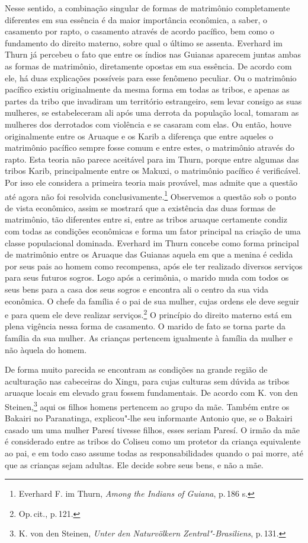 Nesse sentido, a combinação singular de formas de matrimônio
completamente diferentes em sua essência é da maior importância
econômica, a saber, o casamento por rapto, o casamento através de
acordo pacífico, bem como o fundamento do direito materno, sobre qual o
último se assenta. Everhard im Thurn já percebeu o fato que entre os
índios nas Guianas aparecem juntas ambas as formas de matrimônio,
diretamente opostas em sua essência. De acordo com ele, há duas
explicações possíveis para esse fenômeno peculiar. Ou o matrimônio
pacífico existiu originalmente da mesma forma em todas as tribos, e
apenas as partes da tribo que invadiram um território estrangeiro, sem
levar consigo as suas mulheres, se estabeleceram ali após uma derrota
da população local, tomaram as mulheres dos derrotados com violência e
se casaram com elas. Ou então, houve originalmente entre os Aruaque e os
Karib a diferença que entre aqueles o matrimônio pacífico sempre fosse
comum e entre estes, o matrimônio através do rapto. Esta teoria não
parece aceitável para im Thurn, porque entre algumas das tribos Karib,
principalmente entre os Makuxi, o matrimônio pacífico é verificável. Por
isso ele considera a primeira teoria mais provável, mas admite que a
questão até agora não foi resolvida conclusivamente.\footnote{Everhard
  F. im Thurn, \textit{Among the Indians of Guiana}, p.\,186 s.}
Observemos a questão sob o ponto de vista econômico, assim se mostrará
que a existência das duas formas de matrimônio, tão diferentes entre si,
entre as tribos aruaque certamente condiz com todas as condições
econômicas e forma um fator principal na criação de uma classe
populacional dominada. Everhard im Thurn concebe como forma principal
de matrimônio entre os Aruaque das Guianas aquela em que a menina é
cedida por seus pais ao homem como recompensa, após ele ter realizado
diversos serviços para seus futuros sogros. Logo após a cerimônia, o
marido muda com todos os seus bens para a casa dos seus sogros e
encontra ali o centro da sua vida econômica. O chefe da família é o pai
de sua mulher, cujas ordens ele deve seguir e para quem ele deve
realizar serviços.\footnote{Op.\,cit., p.\,121.} O princípio do direito
materno está em plena vigência nessa forma de casamento. O marido de
fato se torna parte da família da sua mulher. As crianças pertencem
igualmente à família da mulher e não àquela do homem.

De forma muito parecida se encontram as condições na grande região de
aculturação nas cabeceiras do Xingu, para cujas culturas sem dúvida as
tribos aruaque locais em elevado grau fossem fundamentais. De acordo com
K. von den Steinen,\footnote{K. von den Steinen, \textit{Unter den
  Naturvölkern Zentral"-Brasiliens}, p.\,131.} aqui os filhos homens
pertencem ao grupo da mãe. Também entre os Bakairi no Paranatinga,
explicou"-lhe seu informante Antonio que, se o Bakairi casado um uma
mulher Paresí tivesse filhos, esses seriam Paresí. O irmão da mãe é
considerado entre as tribos do Coliseu como um protetor da criança
equivalente ao pai, e em todo caso assume todas as responsabilidades
quando o pai morre, até que as crianças sejam adultas. Ele decide sobre
seus bens, e não a mãe.

